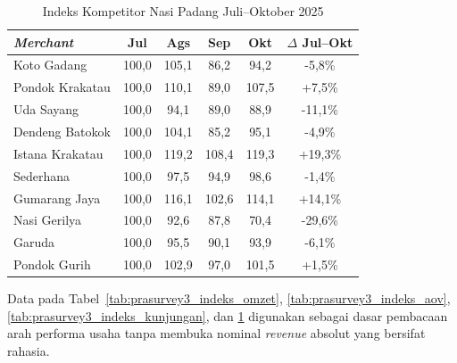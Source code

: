 \begin{table}[h!]
    \centering
    \small
    \caption{Indeks Kompetitor Nasi Padang Juli--Oktober 2025}
    \label{tab:prasurvey3_indeks_kompetitor}
    \begin{tabularx}{\textwidth}{p{4cm}ccccc}
        \toprule
        \textbf{\textit{Merchant}} & \textbf{Jul} & \textbf{Ags} & \textbf{Sep} & \textbf{Okt} & \textbf{$\Delta$ Jul--Okt} \\
        \midrule
        Koto Gadang                & 100,0        & 105,1        & 86,2         & 94,2         & -5,8\%                     \\
        Pondok Krakatau            & 100,0        & 110,1        & 89,0         & 107,5        & +7,5\%                     \\
        Uda Sayang                 & 100,0        & 94,1         & 89,0         & 88,9         & -11,1\%                    \\
        Dendeng Batokok            & 100,0        & 104,1        & 85,2         & 95,1         & -4,9\%                     \\
        Istana Krakatau            & 100,0        & 119,2        & 108,4        & 119,3        & +19,3\%                    \\
        Sederhana                  & 100,0        & 97,5         & 94,9         & 98,6         & -1,4\%                     \\
        Gumarang Jaya              & 100,0        & 116,1        & 102,6        & 114,1        & +14,1\%                    \\
        Nasi Gerilya               & 100,0        & 92,6         & 87,8         & 70,4         & -29,6\%                    \\
        Garuda                     & 100,0        & 95,5         & 90,1         & 93,9         & -6,1\%                     \\
        Pondok Gurih               & 100,0        & 102,9        & 97,0         & 101,5        & +1,5\%                     \\
        \bottomrule
    \end{tabularx}
\end{table}

\FloatBarrier
Data pada Tabel~\ref{tab:prasurvey3_indeks_omzet}, \ref{tab:prasurvey3_indeks_aov}, \ref{tab:prasurvey3_indeks_kunjungan}, dan \ref{tab:prasurvey3_indeks_kompetitor} digunakan sebagai dasar pembacaan arah performa usaha tanpa membuka nominal \textit{revenue} absolut yang bersifat rahasia.
